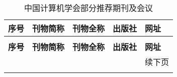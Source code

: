 \documentclass[print, doctor, vlined]{DissertUESTC}
\begin{document}
	\begin{longtable}{p{2em} p{4.5em} p{11em} p{6em} p{11em}}
		\caption{中国计算机学会部分推荐期刊及会议} \label{tab: 中国计算机学会部分推荐期刊及会议} \\
		
		\toprule
		\textbf{序号} & \textbf{刊物简称} & \textbf{刊物全称} & \textbf{出版社} & \textbf{网址} \\
		\midrule
		\endfirsthead
		
		\multicolumn{5}{c}{\CPcaption{中国计算机学会部分推荐期刊及会议}}\\
		\toprule
		\textbf{序号} & \textbf{刊物简称} & \textbf{刊物全称} & \textbf{出版社} & \textbf{网址} \\
		\midrule
		\endhead
		
		\bottomrule
		& & & & \hfill 续下页 \\  %
		\endfoot
		
		\bottomrule
		\endlastfoot
		

\end{longtable}
\end{document}

